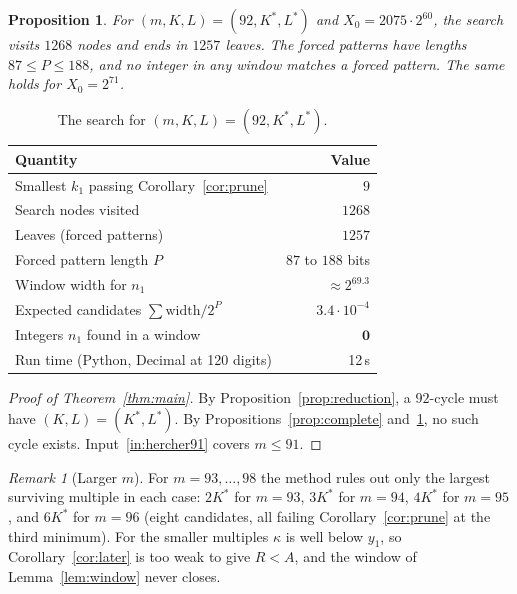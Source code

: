 \documentclass[11pt]{amsart}
\newtheorem{proposition}[theorem]{Proposition}
\theoremstyle{definition}
\theoremstyle{remark}
\newtheorem{remark}[theorem]{Remark}
\newcommand{\Kst}{K^{*}}
\newcommand{\Lst}{L^{*}}
\begin{document}
\begin{proposition}\label{prop:computation}
For $(m, K, L) = (92, \Kst, \Lst)$ and $X_0 = 2075\cdot 2^{60}$, the search visits $1268$ nodes and
ends in $1257$ leaves. The forced patterns have lengths $87 \le P \le 188$, and no integer in any
window matches a forced pattern. The same holds for $X_0 = 2^{71}$.
\end{proposition}

\begin{table}[h]
\centering
\begin{tabular}{@{}lr@{}}
\toprule
Quantity & Value \\
\midrule
Smallest $k_1$ passing Corollary~\ref{cor:prune} & $9$ \\
Search nodes visited & $1268$ \\
Leaves (forced patterns) & $1257$ \\
Forced pattern length $P$ & $87$ to $188$ bits \\
Window width for $n_1$ & $\approx 2^{69.3}$ \\
Expected candidates $\sum \text{width}/2^{P}$ & $3.4\cdot 10^{-4}$ \\
Integers $n_1$ found in a window & $\mathbf{0}$ \\
Run time (Python, Decimal at 120 digits) & 12\,s \\
\bottomrule
\end{tabular}
\caption{The search for $(m, K, L) = (92, \Kst, \Lst)$.}
\end{table}

\begin{proof}[Proof of Theorem~\ref{thm:main}]
By Proposition~\ref{prop:reduction}, a $92$-cycle must have $(K, L) = (\Kst, \Lst)$. By
Propositions~\ref{prop:complete} and~\ref{prop:computation}, no such cycle exists. Input~\ref{in:hercher91}
covers $m \le 91$.
\end{proof}

\begin{remark}[Larger $m$]
For $m = 93, \dots, 98$ the method rules out only the largest surviving multiple in each case:
$2\Kst$ for $m=93$, $3\Kst$ for $m=94$, $4\Kst$ for $m=95$, and $6\Kst$ for $m=96$ (eight candidates,
all failing Corollary~\ref{cor:prune} at the third minimum). For the smaller multiples $\kappa$ is
well below $y_1$, so Corollary~\ref{cor:later} is too weak to give $R < A$, and the window of
Lemma~\ref{lem:window} never closes.
\end{remark}

\end{document}
